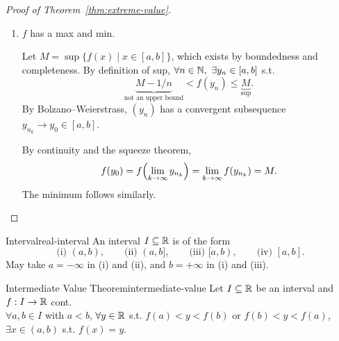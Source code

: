 \begin{proof}[Proof of Theorem~\ref{thm:extreme-value}]
\begin{enumerate}[label=\textbf{Step \arabic*.}, proofparts]
    \item $f$ has a max and min.\par\nopagebreak
          Let $M=\sup\{f(x)\mid x\in[a,b]\}$, which exists by boundedness and completeness.
          By definition of sup, $\forall n\in\mathbb{N},\ \exists y_n\in[a,b]$ s.t.
          \[
            \underbrace{M-1/n}_{\text{not an upper bound}}<f(y_n)\le\underbrace{M}_{\sup}.
          \]
          By Bolzano--Weierstrass, $(y_n)$ has a convergent subsequence $y_{n_k}\to y_0\in[a,b]$.
          \begin{thinking}
            \centering
          \end{thinking}
          By continuity and the squeeze theorem,
          \[
            f(y_0)=f\Bigl(\lim_{k\to\infty}y_{n_k}\Bigr)
            =\lim_{k\to\infty}f(y_{n_k})=M.
          \]
          The minimum follows similarly.\qedhere
  \end{enumerate}
\end{proof}

\begin{definition}{Interval}{real-interval}
  An interval $I\subseteq\mathbb{R}$ is of the form
  \[
    \text{(i) }(a,b),\qquad \text{(ii) }(a,b],\qquad
    \text{(iii) }[a,b),\qquad \text{(iv) }[a,b].
  \]
  May take $a=-\infty$ in (i) and (ii), and $b=+\infty$ in (i) and (iii).
\end{definition}

\begin{theorem}{Intermediate Value Theorem}{intermediate-value}
  Let $I\subseteq\mathbb{R}$ be an interval and $f:I\to\mathbb{R}$ cont.\\
  $\forall a,b\in I$ with $a<b$, $\forall y\in\mathbb{R}$ s.t.
  $f(a)<y<f(b)$ or $f(b)<y<f(a)$,
  $\exists x\in(a,b)$ s.t. $f(x)=y$.
\end{theorem}

